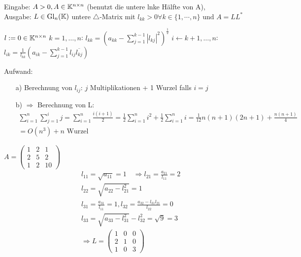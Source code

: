 \begin{Algorithmus}\hfill\newline
	Eingabe: $A > 0, A \in \mathbb K^{n\times n}$ (benutzt die \glqq untere lnke Hälfte \grqq von A),\\
	Ausgabe: $ L \in \mathrm{Gl}_n(\mathbb K)$ untere $\triangle$-Matrix mit $l_{kk} >0 \forall k\in \{1,\cdots,n\} \text{ und } A=LL^*$ 
	\quad
	\begin{codebox}
		\li $l := 0 \in \mathbb K^{n\times n}$
		\li \For $k = 1, \ldots, n$:
		\Do
		\li $l_{kk} = \left(a_{kk} - \sum_{j=1}^{k-1}|l_{kj}|^{2}\right)^{\frac{1}{2}}$
		\li \For $i \gets k + 1, \ldots, n$:
		\Do
		\li $l_{ik} =\frac{1}{l_{kk}} \left(a_{ik} - \sum_{j=1}^{k-1}l_{ij}\overline{l_{kj}}\right)$
		\End
		\End
	\end{codebox}
\end{Algorithmus}
Aufwand:\begin{itemize}
	\item[a)] Berechnung von $l_{ij}$: $j$ Multiplikationen + 1 Wurzel falls $i=j$ 	\item[b)]$\Rightarrow$ Berechnung von L:\begin{align*}
	\sum_{i=1}^{n}\sum_{j=1}^{i}j = \sum_{i=1}^{n} \frac{i(i+1)}{2}= \frac{1}{2}\sum_{i=1}^{n} i^2 + \frac{1}{2} \sum_{i=1}^{n} i = \frac{1}{12}n(n+1)(2n+1)+\frac{n(n+1)}{4}  \\= O(n^3) + n\text{ Wurzel}
	\end{align*}
\end{itemize}
\begin{Beispiel}
	\quad
	$A = \begin{pmatrix}
	1 & 2 & 1\\
	2 & 5 & 2\\
	1 & 2 & 10
	\end{pmatrix}$\\
	\begin{align*}&l_{11}= \sqrt{a_{11}} = 1 \quad\Rightarrow l_{21}=\frac{a_{21}}{l_{11}}=2\\
	&l_{22}= \sqrt{a_{22}-l_{21}^2} = 1\\
	&l_{31}= \frac{a_{31}}{l_{11}} = 1, l_{32}= \frac{a_{32}-l_{31}l_{21}}{l_{22}} = 0\\
	&l_{33}= \sqrt{a_{33}-l_{31}^2}-l_{32}^2 = \sqrt{9}=3\\
	&\Rightarrow L = \begin{pmatrix}
	1 & 0 & 0\\
	2 & 1 & 0\\
	1 & 0 & 3
	\end{pmatrix}
	\end{align*}
\end{Beispiel}

